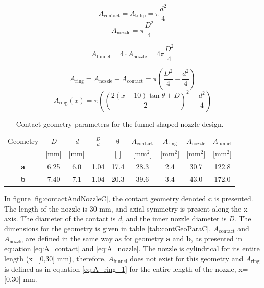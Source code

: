 \documentclass[10pt,b5paper,twoside]{article}
\begin{document}
\begin{equation} \label{eq:A_contact}
A_\mathrm{{contact}}=A_\mathrm{{tulip}}=\pi \frac{d^2}{4}
\end{equation}
\begin{equation} \label{eq:A_nozzle}
A_\mathrm{{nozzle}}=\pi \frac{D^2}{4}
\end{equation}

\begin{equation} \label{eq:A_funnel}
A_\mathrm{{funnel}}=4 \cdot A_\mathrm{{nozzle}}=4\pi \frac{D^2}{4}
\end{equation}

\begin{equation} \label{eq:A_ring_1}
A_\mathrm{{ring}}=A_\mathrm{{nozzle}}-A_\mathrm{{contact}}=\pi\left( \frac{D^2}{4}-\frac{d^2}{4}\right)
\end{equation}
\begin{equation} \label{eq:A_ring_2}
A_\mathrm{{ring}}(x)=\pi\left( \left(\frac{2(x-10)\tan \theta + D}{2}\right)^2-\frac{d^2}{4}\right)
\end{equation}

\begin{table}[H]
\center
\caption{Contact geometry parameters for the funnel shaped nozzle design.}
 \begin{tabular}{|c|c|c|c|c|c|c|c|c|}
\hline 
Geometry & \textit{D} & \textit{d}  & $\frac{D}{d}$ & $\mathrm{\theta}$ & $A_\mathrm{{contact}}$ & $A_\mathrm{{ring}}$  & $A_\mathrm{{nozzle}}$ & $A_\mathrm{{funnel}}$ \\
  & [mm] &  [mm] &   & [$^{\circ}$]  &   [mm$^2$] &  [mm$^2$] &   [mm$^2$] &   [mm$^2$]\\
\hline 
\textbf{a} & 6.25 & 6.0 & 1.04 & 17.4 & 28.3 & 2.4 & 30.7 & 122.8\\ 
\hline 
\textbf{b} & 7.40 & 7.1 & 1.04 & 20.3 & 39.6 & 3.4 & 43.0 & 172.0\\ 
\hline 
\end{tabular} 
\label{tab:contGeoPara}
\end{table}

In figure \ref{fig:contactAndNozzleC}, the contact geometry denoted \textbf{c} is presented. The length of the nozzle is 30 mm, and axial symmetry is present along the x-axis. The diameter of the contact is \textit{d}, and the inner nozzle diameter is \textit{D}. The dimensions for the geometry is given in table \ref{tab:contGeoParaC}. $A_\mathrm{{contact}}$ and $A_\mathrm{{nozzle}}$ are defined in the same way as for geometry \textbf{a} and \textbf{b}, as presented in equation \eqref{eq:A_contact} and \eqref{eq:A_nozzle}. The nozzle is cylindrical for its entire length (x=[0,30] mm), therefore, $A_\mathrm{{funnel}}$ does not exist for this geometry and $A_\mathrm{{ring}}$ is defined as in equation \eqref{eq:A_ring_1} for the entire length of the nozzle, x=[0,30] mm. 
\end{document}

